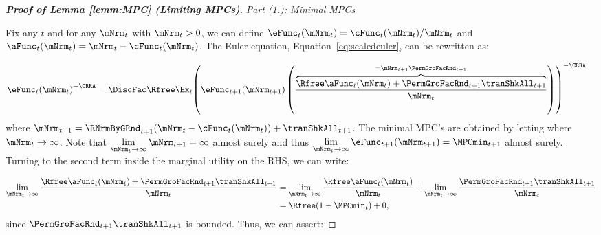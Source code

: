 \documentclass[\econtexRoot/BufferStockTheory]{subfiles}
\begin{document}
\begin{proof}[\textbf{Proof of Lemma \ref{lemm:MPC} (Limiting MPCs)}]

\vspace{0.7em} 
\noindent\textit{Part (1.): Minimal MPCs}  
\vspace{0.7em} 

Fix any $t$ and for any $\mNrm_{t}$ with  $\mNrm_{t}>0$, we can define $\eFunc_{t}(\mNrm_{t})=\cFunc_{t}(\mNrm_{t})/\mNrm_{t}$ and $\aFunc_{t}(\mNrm_{t})= \mNrm_{t} -\cFunc_{t}(\mNrm_{t})$.
The Euler equation, Equation~\eqref{eq:scaledeuler}, can be rewritten as:

\begin{equation}\begin{gathered}\begin{aligned}\label{eq:eFuncEuler}
 \eFunc_{t}{(\mNrm_{t})}^{-\CRRA}  & = \DiscFac \Rfree \Ex_{t}{\left(\eFunc_{t+1}({\mNrm}_{t+1})\left(\frac{\overbrace{\Rfree \aFunc_{t}(\mNrm_{t})+{\PermGroFacRnd}_{t+1}{\tranShkAll}_{t+1}}^{={\mNrm}_{t+1} \PermGroFacRnd_{t+1}}}{\mNrm_{t}}\right)\right)}^{-\CRRA }
\end{aligned}\end{gathered}\end{equation}
%
where ${\mNrm}_{t+1} = \RNrmByGRnd_{t+1}(\mNrm_{t} -\cFunc_{t}(\mNrm_{t})) +\tranShkAll_{t+1}$.
The minimal MPC's are obtained by letting where $\mNrm_{t} \rightarrow \infty$.
Note that $\lim\limits_{\mNrm_{t}\rightarrow \infty} \mNrm_{t+1} = \infty$ almost surely and thus $\lim\limits_{\mNrm_{t}\rightarrow \infty}\eFunc_{t+1}({\mNrm}_{t+1}) = \MPCmin_{t+1}$ almost surely.
Turning to the second term inside the marginal utility on the RHS, we can write:

\begin{equation}\begin{gathered}\begin{aligned}
\lim_{\mNrm_{t}\rightarrow \infty}\frac{\Rfree \aFunc_{t}(\mNrm_{t})+{\PermGroFacRnd}_{t+1}{\tranShkAll}_{t+1}}{\mNrm_{t}} &  = \lim_{\mNrm_{t}\rightarrow \infty}\frac{\Rfree \aFunc_{t}(\mNrm_{t})}{\mNrm_{t}} + \lim_{\mNrm_{t}\rightarrow \infty}\frac{{\PermGroFacRnd}_{t+1}{\tranShkAll}_{t+1}}{\mNrm_{t}} \\
			& = \Rfree (1- \MPCmin_{t}) + 0, 
\end{aligned}\end{gathered}\end{equation}
since ${\PermGroFacRnd}_{t+1}{\tranShkAll}_{t+1}$ is bounded.
Thus, we can assert:


\end{proof}
\end{document}
